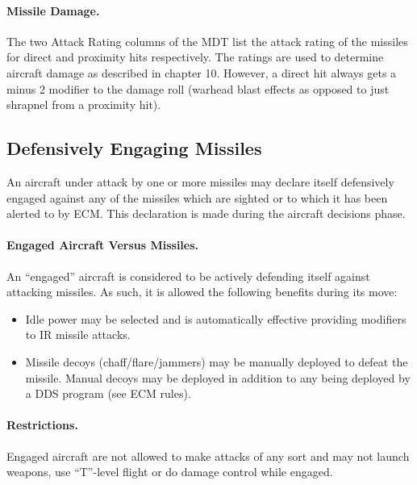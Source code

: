 \paragraph{Missile Damage.} The two Attack Rating columns of the MDT list the attack rating of the missiles for direct and proximity hits respectively. The ratings are used to determine aircraft damage as described in chapter 10. However, a direct hit always gets a minus 2 modifier to the damage roll (warhead blast effects as opposed to just shrapnel from a proximity hit).

\subsection{Defensively Engaging Missiles}

An aircraft under attack by one or more missiles may declare itself defensively engaged against any of the missiles which are sighted or to which it has been alerted to by ECM. This declaration is made during the aircraft decisions phase.

\paragraph{Engaged Aircraft Versus Missiles.} An “engaged” aircraft is considered to be actively defending itself against attacking missiles. As such, it is allowed the following benefits during its move:

\begin{itemize}

    \item Idle power may be selected and is automatically effective providing modifiers to IR missile attacks.

    \item Missile decoys (chaff/flare/jammers) may be manually deployed to defeat the missile. Manual decoys may be deployed in addition to any being deployed by a DDS program (see ECM rules).

    
\end{itemize}

\paragraph{Restrictions.} Engaged aircraft are not allowed to make attacks of any sort and may not launch weapons, use “T”-level flight or do damage control while engaged.


